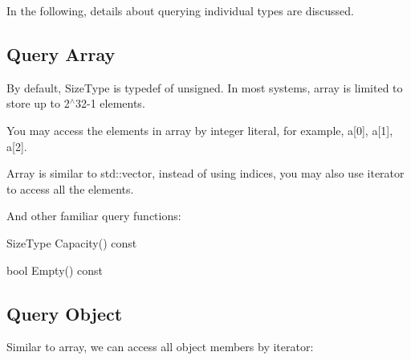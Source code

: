 In the following, details about querying individual types are discussed.\hypertarget{md_Cadriciel_Commun_Externe_RapidJSON_doc_tutorial.zh-cn_QueryArray}{}\subsection{Query Array}\label{md_Cadriciel_Commun_Externe_RapidJSON_doc_tutorial.zh-cn_QueryArray}
By default, {\ttfamily Size\+Type} is typedef of {\ttfamily unsigned}. In most systems, array is limited to store up to 2$^\wedge$32-\/1 elements.

You may access the elements in array by integer literal, for example, {\ttfamily a\mbox{[}0\mbox{]}}, {\ttfamily a\mbox{[}1\mbox{]}}, {\ttfamily a\mbox{[}2\mbox{]}}.

Array is similar to {\ttfamily std\+::vector}, instead of using indices, you may also use iterator to access all the elements. 


And other familiar query functions\+:
\begin{DoxyItemize}
\item {\ttfamily Size\+Type Capacity() const}
\item {\ttfamily bool Empty() const}
\end{DoxyItemize}\hypertarget{md_Cadriciel_Commun_Externe_RapidJSON_doc_tutorial.zh-cn_QueryObject}{}\subsection{Query Object}\label{md_Cadriciel_Commun_Externe_RapidJSON_doc_tutorial.zh-cn_QueryObject}
Similar to array, we can access all object members by iterator\+:





